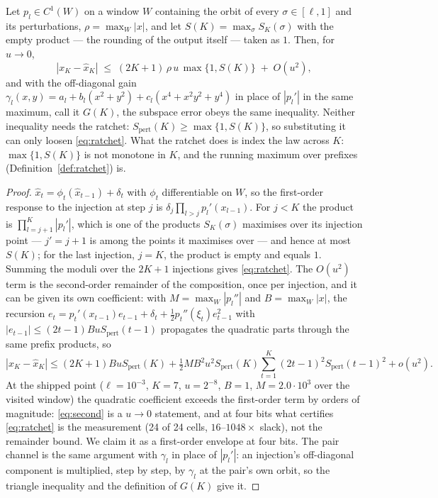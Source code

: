 \begin{proposition}
\label{prop:ratchet}
Let $p_l\in C^1(W)$ on a window $W$ containing the orbit of every $\sigma\in[\ell,1]$ and
its perturbations, $\rho=\max_W|x|$, and let $S(K)=\max_\sigma S_K(\sigma)$ with the empty
product --- the rounding of the output itself --- taken as $1$.  Then, for $u\to0$,
\begin{equation}
|x_K-\hat x_K| \;\le\; (2K+1)\,\rho\,u\,\max\{1,S(K)\} \;+\; O(u^2),
\label{eq:ratchet}
\end{equation}
and with the off-diagonal gain $\gamma_l(x,y)=a_l+b_l(x^2+y^2)+c_l(x^4+x^2y^2+y^4)$ in
place of $|p_l'|$ in the same maximum, call it $G(K)$, the subspace error obeys the same
inequality.  Neither inequality needs the ratchet: $S_{\mathrm{pert}}(K)\ge\max\{1,S(K)\}$,
so substituting it can only loosen \eqref{eq:ratchet}.  What the ratchet does is index the
law across $K$: $\max\{1,S(K)\}$ is not monotone in $K$, and the running maximum over
prefixes (Definition~\ref{def:ratchet}) is.
\end{proposition}

\begin{proof}
$\hat x_t = \phi_t(\hat x_{t-1})+\delta_t$ with $\phi_t$ differentiable on $W$, so the
first-order response to the injection at step $j$ is
$\delta_j\prod_{l>j}p_l'(x_{l-1})$.  For $j<K$ the product is
$\prod_{l=j+1}^{K}|p_l'|$, which is one of the products $S_K(\sigma)$ maximises over its
injection point --- $j'=j+1$ is among the points it maximises over --- and hence at most
$S(K)$; for the last injection, $j=K$, the product is empty and equals $1$.  Summing the
moduli over the $2K+1$ injections gives \eqref{eq:ratchet}.  The $O(u^2)$ term is the
second-order remainder of the composition, once per injection, and it can be given its own
coefficient: with $M=\max_W|p_l''|$ and $B=\max_W|x|$, the recursion
$e_t=p_t'(x_{t-1})e_{t-1}+\delta_t+\tfrac12p_t''(\xi_t)e_{t-1}^2$ with
$|e_{t-1}|\le(2t-1)BuS_{\mathrm{pert}}(t-1)$ propagates the quadratic parts through the
same prefix products, so
\begin{equation}
|x_K-\hat x_K| \le (2K{+}1)BuS_{\mathrm{pert}}(K)
+ \tfrac12 M B^2 u^2 S_{\mathrm{pert}}(K)\sum_{t=1}^{K}(2t-1)^2 S_{\mathrm{pert}}(t-1)^2
+ o(u^2).
\label{eq:second}
\end{equation}
At the shipped point ($\ell=10^{-3}$, $K=7$, $u=2^{-8}$, $B=1$, $M=2.0\cdot10^3$ over the
visited window) the quadratic coefficient exceeds the first-order term by orders of
magnitude: \eqref{eq:second} is a $u\to0$ statement, and at four bits what certifies
\eqref{eq:ratchet} is the measurement (24 of 24 cells, $16$--$1048\times$ slack), not the
remainder bound.  We claim it as a first-order envelope at four bits.  The pair channel is
the same argument with $\gamma_l$ in place of $|p_l'|$: an injection's off-diagonal
component is multiplied, step by step, by $\gamma_l$ at the pair's own orbit, so the
triangle inequality and the definition of $G(K)$ give it.
\end{proof}

